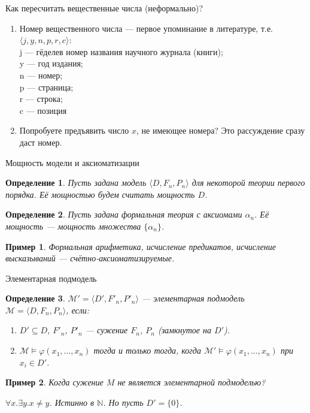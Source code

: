 \documentclass[aspectratio=169]{beamer}
\newtheorem{dfn}{Определение}[section]
\newtheorem{exm}{Пример}[section]
\begin{document}
\begin{frame}{Как пересчитать вещественные числа (неформально)?}
\begin{enumerate}
\item Номер вещественного числа --- первое упоминание в литературе, т.е. $\langle j, y, n, p, r, c \rangle$:\\
j --- гёделев номер названия научного журнала (книги);\\
y --- год издания;\\
n --- номер;\\
p --- страница;\\
r --- строка;\\
c --- позиция\pause
\item Попробуете предъявить число $x$, не имеющее номера? Это рассуждение сразу даст номер.\\
\end{enumerate}
\end{frame}

\begin{frame}{Мощность модели и аксиоматизации}
\begin{dfn} Пусть задана модель $\langle D, F_n, P_n \rangle$ для некоторой теории первого порядка. 
Её мощностью будем считать мощность $D$.
\end{dfn}\pause

\begin{dfn} Пусть задана формальная теория с аксиомами $\alpha_n$. Её мощность --- мощность множества $\{\alpha_n\}$.
\end{dfn}\pause

\begin{exm} Формальная арифметика, исчисление предикатов, исчисление высказываний --- счётно-аксиоматизируемые.
\end{exm}
\end{frame}

\begin{frame}{Элементарная подмодель}
\begin{dfn}$\mathcal{M}' = \langle D', F'_n, P'_n \rangle$ --- элементарная подмодель $\mathcal{M} = \langle D, F_n, P_n \rangle$, 
если: \pause
\begin{enumerate}
\item $D' \subseteq D$, \pause $F'_n$, $P'_n$ --- сужение $F_n$, $P_n$ (замкнутое на $D'$). \pause
\item $\mathcal{M}\models \varphi(x_1,\dots,x_n)$ тогда и только тогда, когда $\mathcal{M}'\models \varphi(x_1,\dots,x_n)$
при $x_i \in D'$. \pause
\end{enumerate}
\end{dfn}

\begin{exm}Когда сужение $M$ не является элементарной подмоделью? \pause

$\forall x.\exists y.x \ne y$. Истинно в $\mathbb{N}$. \pause Но пусть $D' = \{ 0 \}$.
\end{exm}
\end{frame}
\end{document}
